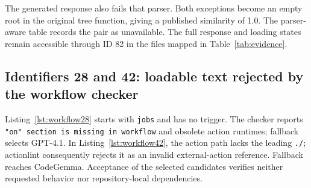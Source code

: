 

The generated response also fails that parser. Both exceptions become an empty root in the original tree function, giving a published similarity of 1.0. The parser-aware table records the pair as unavailable. The full response and loading states remain accessible through ID 82 in the files mapped in Table~\ref{tab:evidence}.

\subsection{Identifiers 28 and 42: loadable text rejected by the workflow checker}
Listing~\ref{lst:workflow28} starts with \texttt{jobs} and has no trigger. The checker reports \texttt{"on" section is missing in workflow} and obsolete action runtimes; fallback selects GPT-4.1. In Listing~\ref{lst:workflow42}, the action path lacks the leading \texttt{./}; actionlint consequently rejects it as an invalid external-action reference. Fallback reaches CodeGemma. Acceptance of the selected candidates verifies neither requested behavior nor repository-local dependencies.


